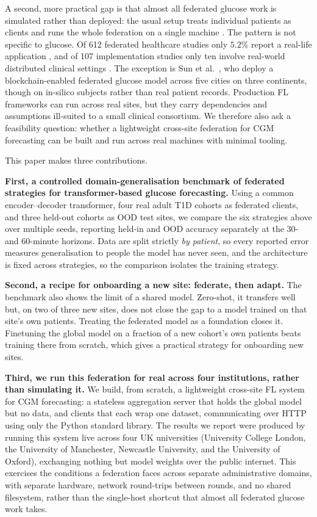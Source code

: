 \documentclass[10pt,letterpaper]{article}
\begin{document}
A second, more practical gap is that almost all federated glucose work is
simulated rather than deployed: the usual setup treats individual patients
as clients and runs the whole federation on a single machine
\cite{piao2023graph,piao2026gluadfl,darpit2025fedglu,defalco2023federated}.
The pattern is not specific to glucose. Of 612 federated healthcare
studies only $5.2\%$ report a real-life application \cite{teo2024federated},
and of 107 implementation studies only ten involve real-world distributed
clinical settings \cite{li2025challenges}. The exception is Sun et al.\
\cite{sun2025multicontinental}, who deploy a blockchain-enabled federated
glucose model across five cities on three continents, though on in-silico
subjects rather than real patient records. Production FL frameworks can run
across real sites, but they carry dependencies and assumptions ill-suited
to a small clinical consortium. We therefore also ask a feasibility
question: whether a lightweight cross-site federation for CGM forecasting
can be built and run across real machines with minimal tooling.

This paper makes three contributions.

\textbf{First, a controlled domain-generalisation benchmark of federated
strategies for transformer-based glucose forecasting.} Using a common
encoder--decoder transformer, four real adult T1D cohorts as federated
clients, and three held-out cohorts as OOD test sites, we compare the six
strategies above over multiple seeds, reporting held-in and OOD accuracy
separately at the 30- and 60-minute horizons. Data are split strictly
\emph{by patient}, so every reported error measures generalisation to
people the model has never seen, and the architecture is fixed across
strategies, so the comparison isolates the training strategy.

\textbf{Second, a recipe for onboarding a new site: federate, then adapt.} The
benchmark also shows the limit of a shared model. Zero-shot, it transfers
well but, on two of three new sites, does not close the gap to a model
trained on that site's own patients. Treating the federated model as a foundation closes it. Finetuning
the global model on a fraction of a new cohort's own patients beats training
there from scratch, which gives a practical strategy for onboarding new
sites.

\textbf{Third, we run this federation for real across four institutions, rather
than simulating it.} We build, from scratch, a lightweight cross-site FL
system for CGM forecasting: a stateless aggregation server that holds the
global model but no data, and clients that each wrap one dataset,
communicating over HTTP using only the Python standard library. The results
we report were produced by running this system live across four UK
universities (University College London, the University of Manchester,
Newcastle University, and the University of Oxford), exchanging nothing
but model weights over the public internet. This exercises the conditions a
federation faces across separate administrative domains, with separate
hardware, network round-trips between rounds, and no shared filesystem,
rather than the single-host shortcut that almost all federated glucose work
takes.
\end{document}
